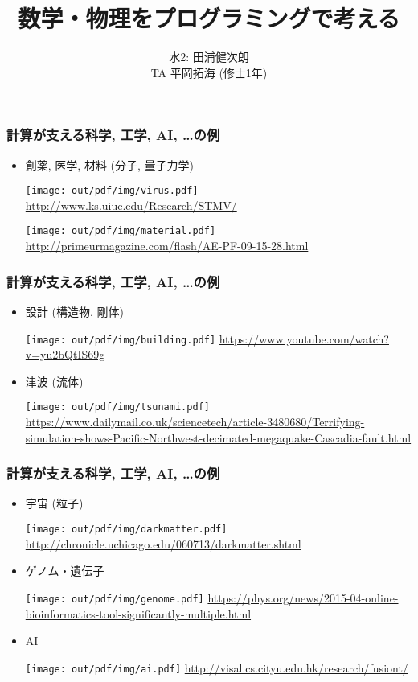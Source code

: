\documentclass[12pt,dvipdfmx]{beamer}
\title{数学・物理をプログラミングで考える}
\institute{}
\author{水2: 田浦健次朗 \\
TA 平岡拓海 (修士1年)
}
\date{}
\begin{document}
\maketitle

\begin{frame}
  \frametitle{計算が支える科学, 工学, AI, \ldots の例}
  \begin{itemize}
  \item 創薬, 医学, 材料 (分子, 量子力学)

    \texttt{[image: out/pdf/img/virus.pdf]}
    {\tiny\url{http://www.ks.uiuc.edu/Research/STMV/}}

    \texttt{[image: out/pdf/img/material.pdf]}
    {\tiny\url{http://primeurmagazine.com/flash/AE-PF-09-15-28.html}}
  \end{itemize}
\end{frame}

\begin{frame}
  \frametitle{計算が支える科学, 工学, AI, \ldots の例}
  \begin{itemize}
  \item 設計 (構造物, 剛体)

    \texttt{[image: out/pdf/img/building.pdf]}
    {\tiny\url{https://www.youtube.com/watch?v=yu2bQtIS69g}}
  
  \item 津波 (流体)

    \texttt{[image: out/pdf/img/tsunami.pdf]}
    {\tiny\url{https://www.dailymail.co.uk/sciencetech/article-3480680/Terrifying-simulation-shows-Pacific-Northwest-decimated-megaquake-Cascadia-fault.html}}

  \end{itemize}
\end{frame}

\begin{frame}
  \frametitle{計算が支える科学, 工学, AI, \ldots の例}
  \begin{itemize}
  \item 宇宙 (粒子)

    \texttt{[image: out/pdf/img/darkmatter.pdf]}
    {\tiny\url{http://chronicle.uchicago.edu/060713/darkmatter.shtml}}
  
  \item ゲノム・遺伝子

    \texttt{[image: out/pdf/img/genome.pdf]}
    {\tiny\url{https://phys.org/news/2015-04-online-bioinformatics-tool-significantly-multiple.html}}

  \item AI

    \texttt{[image: out/pdf/img/ai.pdf]}
    {\tiny\url{http://visal.cs.cityu.edu.hk/research/fusiont/}}
  \end{itemize}
\end{frame}
\end{document}

